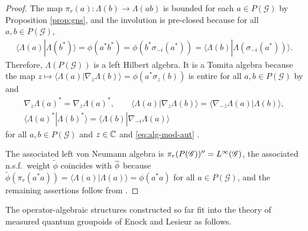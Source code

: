 \begin{proof}
The map $\pi_{r}(a)\colon \Lambda(b) \to \Lambda(ab)$ is bounded for
  each $a \in P(\mathscr{G})$ by Proposition \ref{prop:gns}, and the
  involution is pre-closed because for all $a,b \in P(\mathscr{G})$,
  \begin{align*}
    \langle \Lambda(a)|\Lambda(b^{*})\rangle = \phi(a^{*}b^{*}) =
    \phi(b^{*}\sigma_{-i}(a^{*})) = \langle
    \Lambda(b)|\Lambda(\sigma_{-i}(a^{*}))\rangle.
  \end{align*}
  Therefore, $\Lambda(P(\mathscr{G}))$ is a left Hilbert algebra. It
  is a Tomita algebra because the
  map $z\mapsto \langle \Lambda(a)|\nabla_{z}\Lambda(b)\rangle =
  \phi(a^{*}\sigma_{z}(b))$ is entire for all $a,b\in P(\mathscr{G})$  by
 \cite[Theorem 2.25]{DCT1}
  and
  \begin{gather*}
    \nabla_{z}\Lambda(a)^{*} = \nabla_{\overline{z}}\Lambda(a)^{*}, \qquad
    \langle \Lambda(a)|\nabla_{z}\Lambda(b)\rangle = \langle
    \nabla_{-\overline{z}}\Lambda(a) |\Lambda(b)\rangle, \\ \langle
    \Lambda(a)^{*}|\Lambda(b)^{*}\rangle = \langle \Lambda(b)|\nabla_{-i}\Lambda(a)\rangle
  \end{gather*}
  for all $a,b\in P(\mathscr{G})$ and $z\in \mathbb{C}$ and  \eqref{eq:alg-mod-aut} . 

 The associated left von Neumann algebra is $\pi_{r}(P(\mathscr{G}))''=L^{\infty}(\mathscr{G})$, the
 associated n.s.f.\ weight $\tilde\phi$ coincides with $\overline{\phi}$ because
 $\tilde \phi(\pi_{r}(a^{*}a))=\langle\Lambda(a)|\Lambda(a)\rangle =
 \phi(a^{*}a)$ for all $a\in P(\mathscr{G})$,  and the remaining
 assertions follow  from
  \cite[Theorem VI.2.2 and its proof]{Taksak2}.
\end{proof}


The operator-algebraic structures constructed so far fit into the
theory of measured quantum groupoids of Enock and Lesieur \cite{Eno2,Les1} as follows.

